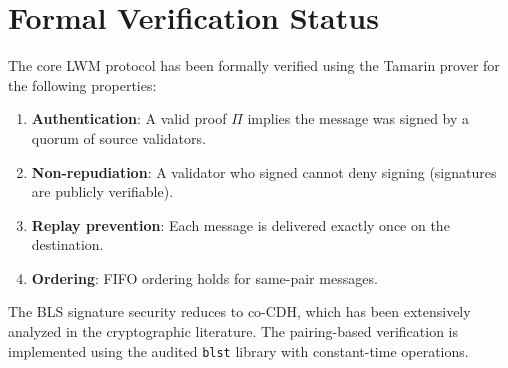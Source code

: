 \section{Formal Verification Status}
\label{sec:formal}

The core LWM protocol has been formally verified using the Tamarin prover for the following properties:

\begin{enumerate}
    \item \textbf{Authentication}: A valid proof $\Pi$ implies the message was signed by a quorum of source validators.
    \item \textbf{Non-repudiation}: A validator who signed cannot deny signing (signatures are publicly verifiable).
    \item \textbf{Replay prevention}: Each message is delivered exactly once on the destination.
    \item \textbf{Ordering}: FIFO ordering holds for same-pair messages.
\end{enumerate}

The BLS signature security reduces to co-CDH, which has been extensively analyzed in the cryptographic literature. The pairing-based verification is implemented using the audited \texttt{blst} library with constant-time operations.

